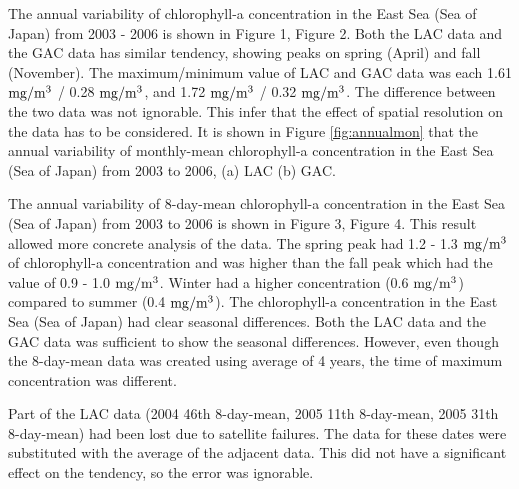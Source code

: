 The annual variability of chlorophyll-a concentration in the East Sea (Sea of Japan) from 2003 - 2006 is shown in Figure 1, Figure 2. Both the LAC data and the GAC data has similar tendency, showing peaks on spring (April) and fall (November). The maximum/minimum value of LAC and GAC data was each 1.61 $\rm mg/m^3$ / 0.28 $\rm mg/m^3$, and 1.72 $\rm mg/m^3$ / 0.32 $\rm mg/m^3$. The difference between the two data was not ignorable. This infer that the effect of spatial resolution on the data has to be considered.
It is shown in Figure \ref{fig:annualmon} that the annual variability of monthly-mean chlorophyll-a concentration in the East Sea (Sea of Japan) from 2003 to 2006, (a) LAC (b) GAC.

 
 


  
  The annual variability of 8-day-mean chlorophyll-a concentration in the East Sea (Sea of Japan) from 2003 to 2006 is shown in Figure 3, Figure 4. This result allowed more concrete analysis of the data. The spring peak had 1.2 - 1.3 $\rm mg/m^3$ of chlorophyll-a concentration and was higher than the fall peak which had the value of 0.9 - 1.0 $\rm mg/m^3$. Winter had a higher concentration (0.6 $\rm mg/m^3$) compared to summer (0.4 $\rm mg/m^3$). The chlorophyll-a concentration in the East Sea (Sea of Japan) had clear seasonal differences. Both the LAC data and the GAC data was sufficient to show the seasonal differences. However, even though the 8-day-mean data was created using average of 4 years, the time of maximum concentration was different. 
  
  Part of the LAC data (2004 46th 8-day-mean, 2005 11th 8-day-mean, 2005 31th 8-day-mean) had been lost due to satellite failures. The data for these dates were substituted with the average of the adjacent data. This did not have a significant effect on the tendency, so the error was ignorable.
 
